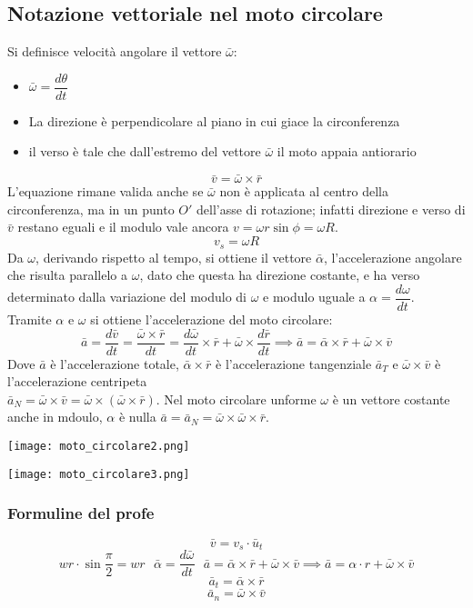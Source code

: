 \documentclass[../../main.tex]{subfiles}
\begin{document}
\subsection{Notazione vettoriale nel moto circolare}
Si definisce velocità angolare il vettore $\bar\omega$:
\begin{itemize}
    \item $\bar\omega = \dfrac{d\theta}{dt}$
    \item La direzione è perpendicolare al piano in cui giace la circonferenza
    \item il verso è tale che dall'estremo del vettore $\bar\omega$ il moto appaia antiorario
\end{itemize}
\[
    \bar v = \bar\omega\times\bar r
\]
L'equazione rimane valida anche se $\bar\omega$ non è applicata al centro della circonferenza, ma in un punto $O'$ dell'asse di rotazione; infatti direzione e verso di $\bar v$ restano eguali e il modulo vale ancora $v = \omega r\sin\phi = \omega R$.
\[
    v_s = \omega R
\]
Da $\omega$, derivando rispetto al tempo, si ottiene il vettore $\bar\alpha$, l'accelerazione angolare che risulta parallelo a $\omega$, dato che questa ha direzione costante, e ha verso determinato dalla variazione del modulo di $\omega$ e modulo uguale a $\alpha = \dfrac{d\omega}{dt}$.\\
Tramite $\alpha$ e $\omega$ si ottiene l'accelerazione del moto circolare:
\[
    \bar a = \dfrac{d\bar v}{dt} = \dfrac{\bar\omega\times\bar r}{dt} = \dfrac{d\bar \omega}{dt}\times\bar r + \bar\omega\times\dfrac{d\bar r}{dt} \implies \bar a = \bar\alpha\times\bar r + \bar\omega\times\bar v
\]
Dove $\bar a$ è l'accelerazione totale, $\bar\alpha\times\bar r$ è l'accelerazione tangenziale $\bar a_T$ e $\bar\omega\times\bar v$ è l'accelerazione centripeta \\$\bar a_N = \bar\omega\times\bar v = \bar\omega\times(\bar\omega\times\bar r)$. Nel moto circolare unforme $\omega$ è un vettore costante anche in mdoulo, $\alpha$ è nulla $\bar a = \bar a_N = \bar\omega\times\bar\omega\times\bar r$.
\begin{minipage}{0.5\textwidth}
    \texttt{[image: moto\_circolare2.png]}
\end{minipage}
\begin{minipage}{0.5\textwidth}
    \texttt{[image: moto\_circolare3.png]}
\end{minipage}
\subsubsection{Formuline del profe}
\[
    \bar{v} = v_s \cdot \bar{u}_t
\]
\[wr\cdot\sin\frac{\pi}{2} = wr \ \ \ \bar\alpha = \dfrac{d\bar\omega}{dt} \ \ \ \bar a = \bar\alpha\times\bar r + \bar\omega\times\bar v \implies \bar a = \alpha\cdot r + \bar\omega\times\bar v\]
\[
    \bar a_t = \bar\alpha\times\bar r
\]
\[
    \bar a_n = \bar{\omega}\times\bar v
\]
\end{document}
